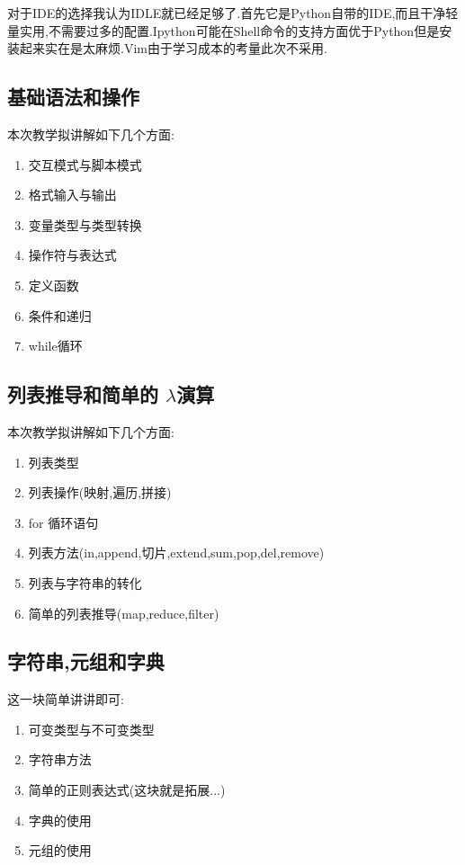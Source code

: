 \documentclass[12pt,a4paper]{article}
\begin{document}
对于IDE的选择我认为IDLE就已经足够了.首先它是Python自带的IDE,而且干净轻量实用,不需要过多的配置.Ipython可能在Shell命令的支持方面优于Python但是安装起来实在是太麻烦.Vim由于学习成本的考量此次不采用.

\subsection{基础语法和操作}
本次教学拟讲解如下几个方面:
\begin{enumerate}
\item 交互模式与脚本模式
\item 格式输入与输出
\item 变量类型与类型转换
\item 操作符与表达式
\item 定义函数
\item 条件和递归
\item while循环

\end{enumerate}

\subsection{列表推导和简单的 $\lambda$演算}
本次教学拟讲解如下几个方面:
\begin{enumerate}
\item 列表类型
\item 列表操作(映射,遍历,拼接)
\item for 循环语句
\item 列表方法(in,append,切片,extend,sum,pop,del,remove)
\item 列表与字符串的转化
\item 简单的列表推导(map,reduce,filter)
\end{enumerate}

\subsection{字符串,元组和字典}
这一块简单讲讲即可:
\begin{enumerate}
\item 可变类型与不可变类型
\item 字符串方法
\item 简单的正则表达式(这块就是拓展...)
\item 字典的使用
\item 元组的使用

\end{enumerate}
\end{document}
